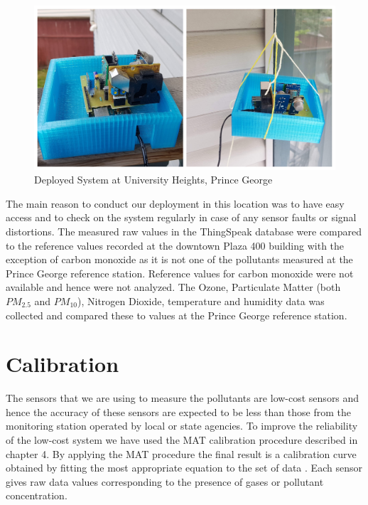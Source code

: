 \begin{figure}[h]
    \begin{center}
    \includegraphics[scale=0.30]{images/figure20.jpg}
    \end{center}
    \caption{Deployed System at University Heights, Prince George}
    \label{deployed}

  \end{figure} 


  The main reason to conduct our deployment in this location was to have easy access and to check on the system regularly in case of any sensor faults or signal distortions. The measured raw values in the ThingSpeak database were compared to the reference values recorded at the downtown Plaza 400 building with the exception of carbon monoxide as it is not one of the pollutants measured at the Prince George reference station. Reference values for carbon monoxide were not available and hence were not analyzed. The Ozone, Particulate Matter (both $PM_{2.5}$ and $PM_{10}$), Nitrogen Dioxide, temperature and humidity data was collected and compared these to values at the Prince George reference station.


\section{Calibration}

The sensors that we are using to measure the pollutants are low-cost sensors and hence the accuracy of these sensors are expected to be less than those from the monitoring station operated by local or state agencies. To improve the reliability of the low-cost system we have used the MAT calibration procedure described in chapter 4. By applying the MAT procedure the final result is a calibration curve obtained by fitting the most appropriate equation to the set of data \cite{Stone2001}. Each sensor gives raw data values corresponding to the presence of gases or pollutant concentration.

